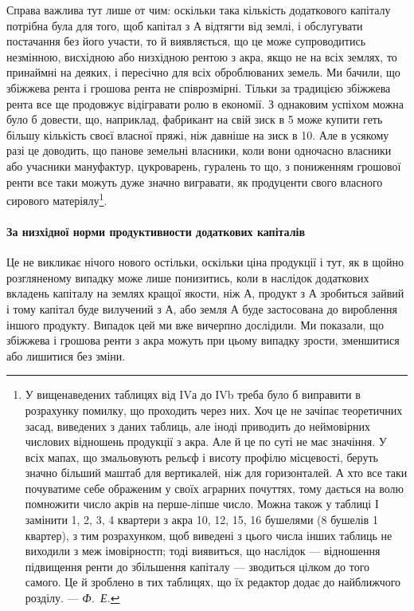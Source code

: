 Справа важлива тут лише от чим: оскільки така кількість додаткового
капіталу потрібна була для того, щоб капітал з $А$ відтягти від землі, і обслугувати
постачання без його участи, то й виявляється, що це може супроводитись
незмінною, висхідною або низхідною рентою з акра, якщо не на всіх землях, то
принаймні на деяких, і пересічно для всіх оброблюваних земель. Ми бачили, що
збіжжева рента і грошова рента не співрозмірні. Тільки за традицією збіжжева
рента все ще продовжує відігравати ролю в економії. З однаковим успіхом можна
було б довести, що, наприклад, фабрикант на свій зиск в 5 може купити
геть більшу кількість своєї власної пряжі, ніж давніше на зиск в 10.
Але в усякому разі це доводить, що панове земельні власники, коли вони одночасно
власники або учасники мануфактур, цукроварень, гуралень то що, з пониженням
грошової ренти все таки можуть дуже значно вигравати, як продуценти
свого власного сирового матеріялу\footnote{
У вищенаведених таблицях від IVа до ІVb треба було б виправити в розрахунку помилку, що
проходить через них. Хоч це не зачіпає теоретичних засад, виведених з даних таблиць, але іноді
приводить до неймовірних числових відношень продукції з акра. Але й це по суті не має значіння. У
всіх мапах, що змальовують рельєф і висоту профілю місцевості, беруть значно більший маштаб для
вертикалей, ніж для горизонталей. А хто все таки почуватиме себе ображеним у своїх аграрних
почуттях, тому дається на волю помножити число акрів на перше-ліпше число. Можна також у таблиці І
замінити 1, 2, 3, 4 квартери з акра 10, 12, 15, 16 бушелями (8 бушелів \deq{} 1 квартер), з тим
розрахунком, щоб виведені з цього числа інших таблиць не виходили з меж імовірностп; тоді виявиться,
що наслідок — відношення підвищення ренти до збільшення капіталу — зводиться цілком до того самого.
Це й зроблено в тих таблицях, що їх редактор додає до найближчого розділу. —\emph{ Ф.~Е.}
}.

\paragraph{За низхідної норми продуктивности додаткових капіталів}

Це не викликає нічого нового остільки, оскільки ціна продукції і тут, як
в щойно розгляненому випадку може лише понизитись, коли в наслідок додаткових
вкладень капіталу на землях кращої якости, ніж $А$, продукт з $А$ зробиться
зайвий і тому капітал буде вилучений з $А$, або земля $А$ буде застосована до вироблення
іншого продукту. Випадок цей ми вже вичерпно дослідили. Ми показали,
що збіжжева і грошова ренти з акра можуть при цьому випадку зрости,
зменшитися або лишитися без зміни.
